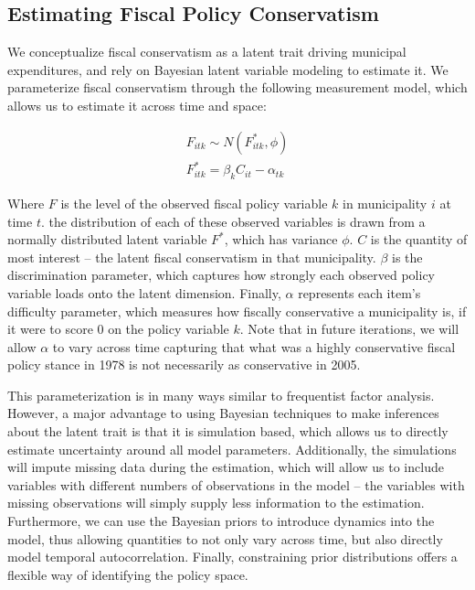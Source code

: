 \documentclass[a4paper,12pt]{article}
\begin{document}
\subsection*{Estimating Fiscal Policy Conservatism}

We conceptualize fiscal conservatism as a latent trait driving municipal expenditures, and rely on Bayesian latent variable modeling to estimate it. We parameterize fiscal conservatism through the following measurement model, which allows us to estimate it across time and space:

\begin{gather*}
F_{itk} \sim N(F^*_{itk}, \phi)\\
F^*_{itk} = \beta_k C_{it} - \alpha_{tk}
\end{gather*}

\noindent Where $F$ is the level of the observed fiscal policy variable $k$ in municipality $i$ at time $t$. the distribution of each of these observed variables is drawn from a normally distributed latent variable $F^*$, which has variance $\phi$. $C$ is the quantity of most interest -- the latent fiscal conservatism in that municipality. $\beta$ is the discrimination parameter, which captures how strongly each observed policy variable loads onto the latent dimension. Finally, $\alpha$ represents each item's difficulty parameter, which measures how fiscally conservative a municipality is, if it were to score 0 on the policy variable $k$. Note that in future iterations, we will allow $\alpha$ to vary across time capturing that what was a highly conservative fiscal policy stance in 1978 is not necessarily as conservative in 2005.

This parameterization is in many ways similar to frequentist factor analysis. However, a major advantage to using Bayesian techniques to make inferences about the latent trait is that it is simulation based, which allows us to directly estimate uncertainty around all model parameters. Additionally, the simulations will impute missing data during the estimation, which will allow us to include variables with different numbers of observations in the model -- the variables with missing observations will simply supply less information to the estimation. Furthermore, we can use the Bayesian priors to introduce dynamics into the model, thus allowing quantities to not only vary across time, but also directly model temporal autocorrelation. Finally, constraining prior distributions offers a flexible way of identifying the policy space.
\end{document}
